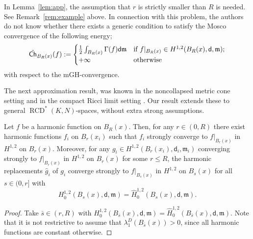 \documentclass[a4paper,11pt,reqno]{article}
\numberwithin{equation}{section}
\theoremstyle{plain}
\theoremstyle{definition}
\theoremstyle{remark}
\newcommand{\Ch}{{\sf Ch}}
\newcommand{\dist}{\mathsf{d}}
\newcommand{\meas}{\mathfrak{m}}
\DeclareMathOperator{\RCD}{RCD}
\begin{document}
{\begin{remark}
In Lemma~\ref{lem:app}, the assumption that $r$ is strictly smaller than $R$ is needed. See Remark~\ref{rem:example} above.
In connection with this problem, the authors do not know whether there exists a generic condition to satisfy the Mosco convergence of the following energy;
\begin{equation}\label{eq:local energy3}
\tilde{\Ch}_{B_R(x)}(f):=
\begin{cases}\frac{1}{2}\int_{B_R(x)}\Gamma(f)\dist \meas &\text{if $f|_{B_R(x)}\in H^{1, 2}(B_R(x), \dist, \meas)$;}\\
+\infty &\text{otherwise}
\end{cases}
\end{equation}
with respect to the mGH-convergence.
%
%
\end{remark}

The next approximation result,  was known in the noncollapsed metric cone setting \cite{Ding2}
and in the compact Ricci limit setting \cite{Honda3}.
Our result extends these to general $\RCD^*(K, N)$-spaces, without extra strong assumptions.

\begin{corollary}\label{cor:harm harm}
Let $f$ be a harmonic function on $B_R(x)$. Then,  for any $r\in (0,R)$ there exist harmonic functions 
$f_{i}$ on $B_r(x_i)$ such that $f_i$ strongly converge to $f\vert_{B_r(x)}$ in $H^{1, 2}$ on $B_r(x)$.
Moreover, for any $g_i \in H^{1, 2}(B_r(x_i), \dist_i, \meas_i)$ converging strongly to $f\vert_{B_r(x)}$ in $H^{1, 2}$ on $B_r(x)$ 
for some $r\le R$, the harmonic replacements $\hat{g}_i$ of $g_i$ converge strongly to $f\vert_{B_s(x)}$ in $H^{1, 2}$ on $B_s(x)$
for all $s \in (0, r]$ with
$$
H^{1, 2}_0(B_s(x), \dist, \meas) =\hat{H}^{1, 2}_0(B_s(x), \dist, \meas).
$$  
\end{corollary}
\begin{proof} %
Take $\bar s\in (r, R)$ with $H^{1, 2}_0(B_{\bar s}(x), \dist, \meas) =\hat{H}^{1, 2}_0(B_{\bar s}(x), \dist, \meas)$.
Note that it is not restrictive to assume that $\lambda_1^D(B_{\bar s}(x)) >0$, since all harmonic functions are
constant otherwise.


\end{proof}}
\end{document}
